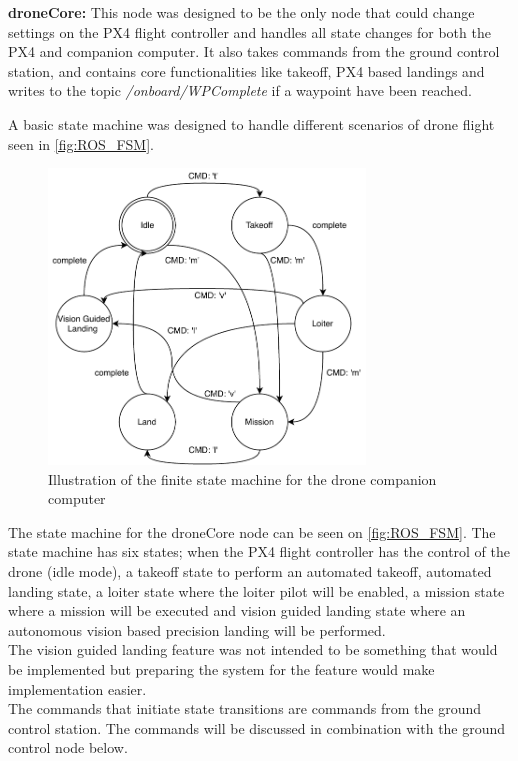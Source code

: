 \documentclass[../Head/Main.tex]{subfiles}
\begin{document}
\clearpage
\textbf{droneCore:} This node was designed to be the only node that could change settings on the PX4 flight controller and handles all state changes for both the PX4 and companion computer. It also takes commands from the ground control station, and contains core functionalities like takeoff, PX4 based landings and writes to the topic \textit{/onboard/WPComplete} if a waypoint have been reached. \par
A basic state machine was designed to handle different scenarios of drone flight seen in \autoref{fig:ROS_FSM}. 
\begin{figure}[H]
    \centering
    \includegraphics[width=0.75\textwidth]{../Figures/simulation/ROS_framwork_FSM.pdf}
    \caption{Illustration of the finite state machine for the drone companion computer}
    \label{fig:ROS_FSM}
\end{figure}
The state machine for the droneCore node can be seen on \autoref{fig:ROS_FSM}. The state machine has six states; when the PX4 flight controller has the control of the drone (idle mode), a takeoff state to perform an automated takeoff, automated landing state, a loiter state where the loiter pilot will be enabled, a mission state where a mission will be executed and vision guided landing state where an autonomous vision based precision landing will be performed.\\
The vision guided landing feature was not intended to be something that would be implemented but preparing the system for the feature would make implementation easier.\\
The commands that initiate state transitions are commands from the ground control station. The commands will be discussed in combination with the ground control node below.
\end{document}
